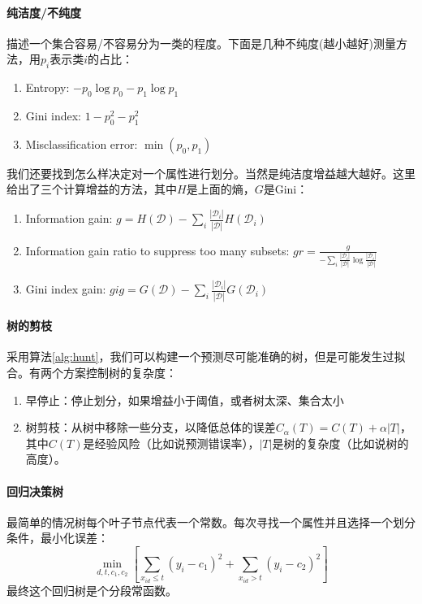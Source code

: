 \paragraph{纯洁度/不纯度} 描述一个集合容易/不容易分为一类的程度。下面是几种不纯度(越小越好)测量方法，用$p_i$表示类$i$的占比：
\begin{enumerate}
    \item Entropy: $-p_0\log p_0 - p_1\log p_1$
    \item Gini index: $1-p_0^2-p_1^2$
    \item Misclassification error: $\min(p_0, p_1)$
\end{enumerate}
我们还要找到怎么样决定对一个属性进行划分。当然是纯洁度增益越大越好。这里给出了三个计算增益的方法，其中$H$是上面的熵，$G$是Gini：
\begin{enumerate}
    \item Information gain: $g = H(\mathcal{D}) - \sum_i \frac{|\mathcal{D}_i|}{|\mathcal{D}|}H(\mathcal{D}_i)$
    \item Information gain ratio to suppress too many subsets: $gr = \frac{g}{-\sum_i \frac{|\mathcal{D}_i|}{|\mathcal{D}|}\log \frac{|\mathcal{D}_i|}{|\mathcal{D}|}}$
    \item Gini index gain: $gig = G(\mathcal{D}) - \sum_i \frac{|\mathcal{D}_i|}{|\mathcal{D}|}G(\mathcal{D}_i)$
\end{enumerate}

\paragraph{树的剪枝}
采用算法\ref{alg:hunt}，我们可以构建一个预测尽可能准确的树，但是可能发生过拟合。有两个方案控制树的复杂度：
\begin{enumerate}
\item 早停止：停止划分，如果增益小于阈值，或者树太深、集合太小
\item 树剪枝：从树中移除一些分支，以降低总体的误差$C_\alpha(T) = C(T) + \alpha|T|$，其中$C(T)$是经验风险（比如说预测错误率），$|T|$是树的复杂度（比如说树的高度）。
\end{enumerate}

\paragraph{回归决策树}
最简单的情况树每个叶子节点代表一个常数。每次寻找一个属性并且选择一个划分条件，最小化误差：
$$\min_{d, t, c_1, c_2}\left[\sum_{x_{id} \le t}(y_i - c_1)^2 + \sum_{x_{id} > t}(y_i - c_2)^2\right]$$
最终这个回归树是个分段常函数。


